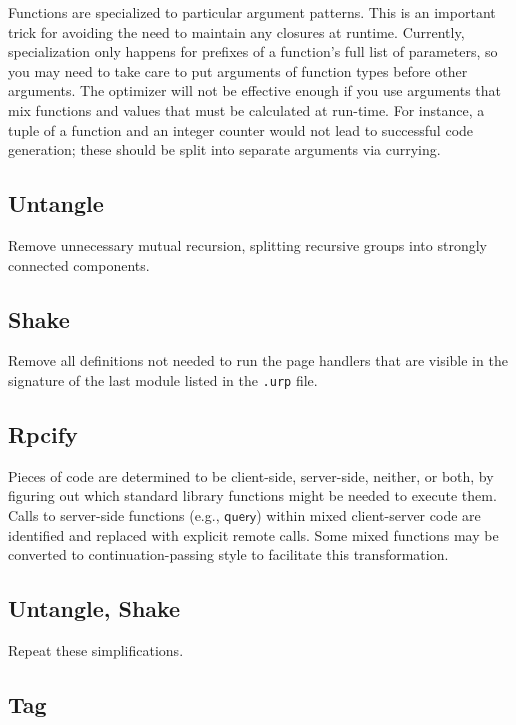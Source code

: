 \documentclass{article}
\newcommand{\mt}[1]{\mathsf{#1}}
\begin{document}
Functions are specialized to particular argument patterns.  This is an important trick for avoiding the need to maintain any closures at runtime.  Currently, specialization only happens for prefixes of a function's full list of parameters, so you may need to take care to put arguments of function types before other arguments.  The optimizer will not be effective enough if you use arguments that mix functions and values that must be calculated at run-time.  For instance, a tuple of a function and an integer counter would not lead to successful code generation; these should be split into separate arguments via currying.

\subsection{Untangle}

Remove unnecessary mutual recursion, splitting recursive groups into strongly connected components.

\subsection{Shake}

Remove all definitions not needed to run the page handlers that are visible in the signature of the last module listed in the \texttt{.urp} file.

\subsection{Rpcify}

Pieces of code are determined to be client-side, server-side, neither, or both, by figuring out which standard library functions might be needed to execute them.  Calls to server-side functions (e.g., $\mt{query}$) within mixed client-server code are identified and replaced with explicit remote calls.  Some mixed functions may be converted to continuation-passing style to facilitate this transformation.

\subsection{Untangle, Shake}

Repeat these simplifications.

\subsection{\label{tag}Tag}
\end{document}
